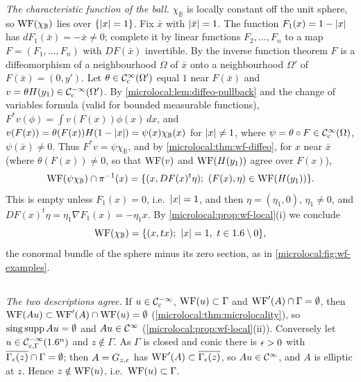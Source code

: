 \emph{The characteristic function of the ball.} $\chi_{\mathbb B}$ is locally constant off the
unit sphere, so $\operatorname{WF}(\chi_{\mathbb B})$ lies over $\{\lvert x\rvert=1\}$. Fix $\bar x$ with $\lvert \bar x\rvert=1$.
The function $F_1(x)=1-\lvert x\rvert$ has $dF_1(\bar x)=-\bar x\ne0$; complete it by linear functions
$F_2,\dots,F_n$ to a map $F=(F_1,\dots,F_n)$ with $DF(\bar x)$ invertible. By the inverse function
theorem $F$ is a diffeomorphism of a neighbourhood $\Omega$ of $\bar x$ onto a neighbourhood
$\Omega'$ of $F(\bar x)=(0,y')$. Let $\theta\in\mathcal{C}^\infty_{\mathrm{c}}(\Omega')$ equal $1$ near $F(\bar x)$ and
$v=\theta H(y_1)\in\mathcal{C}^{-\infty}_{\mathrm{c}}(\Omega')$. By \cref{microlocal:lem:diffeo-pullback} and the change of
variables formula (valid for bounded measurable functions),
$F^*v(\phi)=\int v(F(x))\phi(x)\,dx$, and $v(F(x))=\theta(F(x))H(1-\lvert x\rvert)=\psi(x)\chi_{\mathbb B}(x)$
for $\lvert x\rvert\ne1$, where $\psi=\theta\circ F\in\mathcal{C}^\infty_{\mathrm{c}}(\Omega)$, $\psi(\bar x)\ne0$. Thus
$F^*v=\psi\chi_{\mathbb B}$, and by \cref{microlocal:thm:wf-diffeo}, for $x$ near $\bar x$ (where
$\theta(F(x))\ne0$, so that $\operatorname{WF}(v)$ and $\operatorname{WF}(H(y_1))$ agree over $F(x)$),
\begin{equation*}
  \WF(\psi\chi_{\mathbb B})\cap\pi^{-1}(x)=\{(x,DF(x)^t\eta);\ (F(x),\eta)\in\WF(H(y_1))\}.
\end{equation*}
This is empty unless $F_1(x)=0$, i.e.\ $\lvert x\rvert=1$, and then $\eta=(\eta_1,0)$, $\eta_1\ne0$, and
$DF(x)^t\eta=\eta_1\nabla F_1(x)=-\eta_1x$. By \cref{microlocal:prop:wf-local}(i) we conclude
\begin{equation*}
  \operatorname{WF}(\chi_{\mathbb B})=\{(x,tx);\ \lvert x\rvert=1,\ t\in1.6\setminus0\},
\end{equation*}
the conormal bundle of the sphere minus its zero section, as in \cref{microlocal:fig:wf-examples}.

\subsection*{}
\emph{The two descriptions agree.} If $u\in\mathcal{C}^{-\infty}_{\mathrm{c}}$, $\operatorname{WF}(u)\subset\Gamma$ and $\operatorname{WF}'(A)\cap\Gamma=\emptyset$,
then $\operatorname{WF}(Au)\subset\operatorname{WF}'(A)\cap\operatorname{WF}(u)=\emptyset$ (\cref{microlocal:thm:microlocality}), so
$\operatorname{sing\,supp} Au=\emptyset$ and $Au\in\mathcal{C}^\infty$ (\cref{microlocal:prop:wf-local}(ii)). Conversely let
$u\in\mathcal C^{-\infty}_{c,\Gamma}(1.6^n)$ and $z\notin\Gamma$. As $\Gamma$ is closed and conic there is
$\epsilon>0$ with $\overline{\Gamma_\epsilon(z)}\cap\Gamma=\emptyset$; then $A=G_{z,\epsilon}$ has
$\operatorname{WF}'(A)\subset\overline{\Gamma_\epsilon(z)}$, so $Au\in\mathcal{C}^\infty$, and $A$ is elliptic at $z$. Hence
$z\notin\operatorname{WF}(u)$, i.e.\ $\operatorname{WF}(u)\subset\Gamma$.

